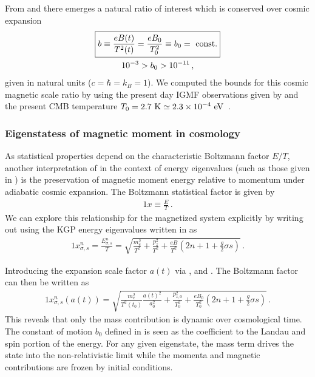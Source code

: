 From  and  there emerges a natural ratio of interest which is conserved over cosmic expansion 
\begin{gather}
 \label{tbscale}
 \boxed{b\equiv\frac{e{B}(t)}{T^{2}(t)}=\frac{e{B}_{0}}{T_{0}^{2}}\equiv b_0={\rm\ const.}}\\
 10^{-3}>b_{0}>10^{-11}\,,
\end{gather}
given in natural units ($c=\hbar=k_{B}=1$). We computed the bounds for this cosmic magnetic scale ratio by using the present day IGMF observations given by  and the present CMB temperature $T_{0}=2.7{\rm\ K}\simeq2.3\times10^{-4}\eV$~\cite{Planck:2018vyg}.

\subsubsection{Eigenstatess of magnetic moment in cosmology}
\label{sec:protection}

As statistical properties depend on the characteristic Boltzmann factor $E/T$, another interpretation of  in the context of energy eigenvalues (such as those given in ) is the preservation of magnetic moment energy relative to momentum under adiabatic cosmic expansion. The Boltzmann statistical factor is given by
\begin{alignat}{1}
    \label{Boltz} x\equiv\frac{E}{T}\,.
\end{alignat}
We can explore this relationship for the magnetized system explicitly by writing out  using the KGP energy eigenvalues written in  as
\begin{alignat}{1}
    \label{XExplicit} x_{\sigma,s}^{n} = \frac{E_{\sigma,s}^{n}}{T} = \sqrt{\frac{m_{e}^{2}}{T^{2}}+\frac{p_{z}^{2}}{T^{2}}+\frac{eB}{T^{2}}\left(2n+1+\frac{g}{2}\sigma s\right)}\,.
\end{alignat}

Introducing the expansion scale factor $a(t)$ via ,  and . The Boltzmann factor can then be written as
\begin{alignat}{1}
    \label{xscale:1} x_{\sigma,s}^{n}(a(t)) = \sqrt{\frac{m_{e}^{2}}{T^{2}(t_{0})}\frac{a(t)^{2}}{a_{0}^{2}}+\frac{p_{z,0}^{2}}{T_{0}^{2}}+\frac{eB_{0}}{T_{0}^{2}}\left(2n+1+\frac{g}{2}\sigma s\right)}\,.
\end{alignat}
This reveals that only the mass contribution is dynamic over cosmological time. The constant of motion $b_{0}$ defined in  is seen as the coefficient to the Landau and spin portion of the energy. For any given eigenstate, the mass term drives the state into the non-relativistic limit while the momenta and magnetic contributions are frozen by initial conditions. 

